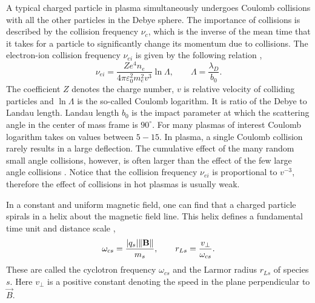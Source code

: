 A typical charged particle in plasma simultaneously undergoes Coulomb collisions with all the other particles in the Debye sphere. The importance of collisions is described by the collision frequency $ \nu_c $, which is the inverse of the mean time that it takes for a particle to significantly change its momentum due to collisions. The electron-ion collision frequency $ \nu_{ei} $ is given by the following relation \cite{nicholson},
\begin{equation}
\label{2.1.6}
\nu_{ei} = \frac{Z e^4 n_e}{4 \pi \varepsilon_0^2 m_e^2 v^3} \ln{\Lambda}, \qquad \Lambda = \frac{\lambda_D}{b_0}.
\end{equation}
The coefficient $ Z $ denotes the charge number, $ v $ is relative velocity of colliding particles and $ \ln \Lambda $ is the so-called Coulomb logarithm. It is ratio of the Debye to Landau length. Landau length $ b_0 $ is the impact parameter at which the scattering angle in the center of mass frame is $ 90^\circ $. For many plasmas of interest Coulomb logarithm takes on values between $ 5 - 15 $. In plasma, a single Coulomb collision rarely results in a large deflection. The cumulative effect of the many random small angle collisions, however, is often larger than the effect of the few large angle collisions \cite{Chen1984}. Notice that the collision frequency $ \nu_{ei} $ is proportional to $ v^{-3} $, therefore the effect of collisions in hot plasmas is usually weak.

In a constant and uniform magnetic field, one can find that a charged particle spirals in a helix about the magnetic field line. This helix defines a fundamental time unit and distance scale \cite{Chen1984},
\begin{equation}
\label{2.1.7}
\omega_{cs} = \frac{\lvert q_{s}\rvert \lVert\mathbf{B}\rVert}{m_{s}}, \qquad r_{Ls} = \frac{v_\perp}{\omega_{cs}}.
\end{equation}
These are called the cyclotron frequency $ \omega_{cs} $ and the Larmor radius $ r_{Ls} $ of species $ s $. Here $ v_\perp $ is a positive constant denoting the speed in the plane perpendicular to $ \vec{B} $.
